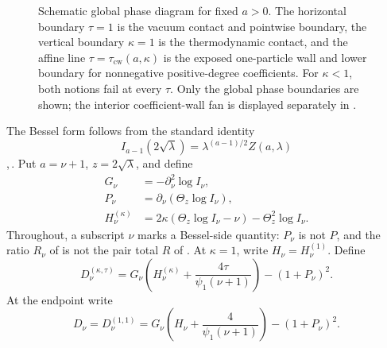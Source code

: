 \documentclass[11pt,a4paper]{amsart}
\numberwithin{equation}{section}
\theoremstyle{plain}
\theoremstyle{definition}
\newcommand{\Thetaz}{\Theta_z}
\begin{document}
\begin{figure}[ht]
\centering
{}
\caption{Schematic global phase diagram for fixed \(a>0\).  The horizontal boundary
\(\tau=1\) is the vacuum contact and pointwise boundary, the vertical boundary
\(\kappa=1\) is the thermodynamic contact, and the affine line
\(\tau=\tau_{\mathrm{cw}}(a,\kappa)\) is the exposed one-particle wall and lower boundary for nonnegative
positive-degree coefficients.  For \(\kappa<1\), both notions fail at every
\(\tau\).  Only the global phase boundaries are shown; the interior
coefficient-wall fan is displayed separately in .}
\label{fig:phase-diagram}
\end{figure}

The Bessel form follows from the standard identity
\begin{equation}\label{eq:I-Z}
 I_{a-1}(2\sqrt\lambda)=\lambda^{(a-1)/2}Z(a,\lambda)
\end{equation}
\cite[eq.~10.25.2]{NISTDLMFBessel},\,\cite[\S3.7]{Watson1944TreatiseBessel}.
Put \(a=\nu+1\), \(z=2\sqrt\lambda\), and define
\begin{align}
 G_\nu&=-\partial_\nu^2\log I_\nu,\label{eq:Gnu}\\
 P_\nu&=\partial_\nu(\Thetaz\log I_\nu),\label{eq:Pnu}\\
 H_\nu^{(\kappa)}
 &=2\kappa(\Thetaz\log I_\nu-\nu)-\Thetaz^2\log I_\nu.\label{eq:Hnu-kappa}
\end{align}
Throughout, a subscript \(\nu\) marks a Bessel-side quantity: \(P_\nu\) is not
\(P\), and the ratio \(R_\nu\) of  is not the pair total \(R\)
of .
At \(\kappa=1\), write \(H_\nu=H_\nu^{(1)}\).  Define
\begin{equation}\label{eq:Dnu-kt-def}
 D_\nu^{(\kappa,\tau)}
 =G_\nu\left(H_\nu^{(\kappa)}+\frac{4\tau}{\psi_1(\nu+1)}\right)
 -(1+P_\nu)^2.
\end{equation}
At the endpoint write
\begin{equation}\label{eq:Dnu-def}
 D_\nu=D_\nu^{(1,1)}
 =G_\nu\left(H_\nu+\frac4{\psi_1(\nu+1)}\right)-(1+P_\nu)^2.
\end{equation}
\end{document}
